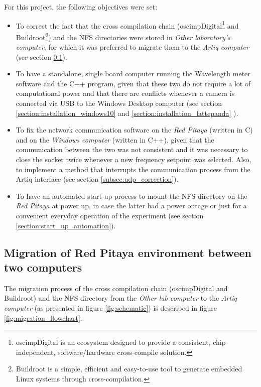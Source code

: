 \documentclass[a4paper,12pt]{article}
\begin{document}
For this project, the following objectives were set:
\begin{itemize}
\itemsep 0em %
    \item To correct the fact that the cross compilation chain (oscimpDigital\footnote{oscimpDigital is an ecosystem designed to provide a consistent, chip independent, software/hardware cross-compile solution.} and Buildroot\footnote{Buildroot is a simple, efficient and easy-to-use tool to generate embedded Linux systems through cross-compilation.}) and the NFS directories were stored in \textit{Other laboratory's computer}, for which it was preferred to migrate them to the \textit{Artiq computer} (see section \ref{section:migration_section}).
    \item To have a standalone, single board computer running the Wavelength meter software and the C++ program, given that these two do not require a lot of computational power and that there are conflicts whenever a camera is connected via USB to the Windows Desktop computer (see section \ref{section:installation_windows10} and \ref{section:installation_lattepanda} ).
    \item To fix the network communication software on the \textit{Red Pitaya} (written in C) and on the \textit{Windows computer} (written in C++), given that the communication between the two was not consistent and it was necessary to close the socket twice whenever a new frequency setpoint was selected. Also, to implement a method that interrupts the communication process from the Artiq interface (see section \ref{subsec:udp_correction}).
    \item To have an automated start-up process to mount the NFS directory on the \textit{Red Pitaya} at power up, in case the latter had a power outage or just for a convenient everyday operation of the experiment (see section \ref{section:start_up_automation}).
\end{itemize}

\subsection{Migration of Red Pitaya environment between two computers}
\label{section:migration_section}

The migration process of the cross compilation chain (oscimpDigital and Buildroot) and the
NFS directory from the \textit{Other lab computer} to the \textit{Artiq computer} (as presented in figure \ref{fig:schematic}) is described in figure \ref{fig:migration_flowchart}.
\end{document}
